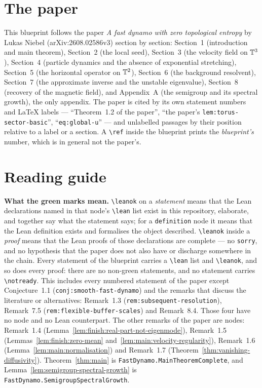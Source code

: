 
\section*{The paper}

This blueprint follows the paper \emph{A fast dynamo with zero topological entropy} by Lukas
Niebel (arXiv:2608.02586v3) section by section: Section~1 (introduction and main theorem),
Section~2 (the local seed), Section~3 (the velocity field on $\mathbb{T}^3$), Section~4 (particle dynamics
and the absence of exponential stretching), Section~5 (the horizontal operator on $\mathbb{T}^2$),
Section~6 (the background resolvent), Section~7 (the approximate inverse and the unstable
eigenvalue), Section~8 (recovery of the magnetic field), and Appendix~A (the semigroup and its spectral growth), the only appendix.  The paper
is cited by its own statement numbers and LaTeX labels --- ``Theorem~1.2 of the paper'',
``the paper's \texttt{lem:torus-sector-basic}'', ``\texttt{eq:global-u}'' --- and unlabelled
passages by their position relative to a label or a section.  A \texttt{\textbackslash ref}
inside the blueprint prints the \emph{blueprint's} number, which is in general not the paper's.

\section*{Reading guide}

\textbf{What the green marks mean.}  \texttt{\textbackslash leanok} on a \emph{statement}
means that the Lean declarations named in that node's \texttt{\textbackslash lean} list exist
in this repository, elaborate, and together say what the statement says; for a
\texttt{definition} node it means that the Lean definition exists and formalises the object
described.  \texttt{\textbackslash leanok} inside a \emph{proof} means that the Lean proofs of
those declarations are complete --- no \texttt{sorry}, and no hypothesis that the paper
does not also have or discharge somewhere in the chain.  Every statement of the blueprint
carries a \texttt{\textbackslash lean} list and \texttt{\textbackslash leanok}, and so does
every proof: there are no non-green statements, and no statement carries
\texttt{\textbackslash notready}.  This includes every numbered statement of the paper except
Conjecture~1.1 (\texttt{conj:smooth-fast-dynamo}) and the remarks that discuss the literature
or alternatives: Remark~1.3 (\texttt{rem:subsequent-resolution}), Remark~7.5
(\texttt{rem:flexible-buffer-scales}) and Remark~8.4.  Those four have no node and no Lean
counterpart.  The other remarks of the paper are nodes: Remark~1.4
(Lemma~\ref{lem:finish:real-part-not-eigenmode}), Remark~1.5
(Lemmas~\ref{lem:finish:zero-mean} and~\ref{lem:main:velocity-regularity}), Remark~1.6
(Lemma~\ref{lem:main:normalisation}) and Remark~1.7
(Theorem~\ref{thm:vanishing-diffusivity}).  Theorem~\ref{thm:main} is
\texttt{FastDynamo.MainTheoremComplete}, and Lemma~\ref{lem:semigroup-spectral-growth} is
\texttt{FastDynamo.SemigroupSpectralGrowth}.

